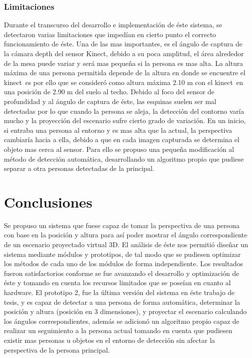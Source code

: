 \documentclass[a4paper,openright,12pt]{report}
\begin{document}
\subsection{Limitaciones}
Durante el transcurso del desarrollo e implementación de éste sistema, se detectaron varias limitaciones que impedían en cierto punto el correcto funcionamiento de éste. Una de las mas importantes, es el ángulo de captura de la cámara depth del sensor Kinect\textcopyright, debido a su poca amplitud, el área alrededor de la mesa puede variar y será mas pequeña si la persona es mas alta. La altura máxima de una persona permitida depende de la altura en donde se encuentre el kinect\textcopyright\, es por ello que se consideró como altura máxima 2.10 m con el kinect\textcopyright\ en una posición de 2.90 m del suelo al techo. Debido al foco del sensor de profundidad y al ángulo de captura de éste, las esquinas suelen ser mal detectadas por lo que cuando la persona se aleja, la detección del contorno varía mucho y la proyección del escenario sufre cierto grado de variación. En un inicio, si entraba una persona al entorno y es mas alta que la actual, la perspectiva cambiaría hacia a ella, debido a que en cada imagen capturada se determina el objeto mas cerca al sensor. Para ello se propuso una pequeña modificación al método de detección automática, desarrollando un algoritmo propio que pudiese separar a otra personas detectadas de la principal.

\chapter{Conclusiones}\label{cap.conclusiones}
Se propuso un sistema que fuese capaz de tomar la perspectiva de una persona con base en la posición y altura para así poder mostrar el ángulo correspondiente de un escenario proyectado virtual 3D. El análisis de éste nos permitió diseñar un sistema mediante módulos y prototipos, de tal modo que se pudiesen optimizar los métodos de cada uno de los módulos de forma independiente. Los resultados fueron satisfactorios conforme se fue avanzando el desarrollo y optimización de éste y tomando en cuenta los recursos limitados que se poseían en cuanto al hardware. El prototipo 2, fue la última versión del sistema en éste trabajo de tesis, y es capaz de detectar a una persona de forma automática, determinar la posición y altura (posición en 3 dimensiones), y proyectar el escenario calculando los ángulos correspondientes, además se adicionó un algoritmo propio capaz de realizar un seguimiento a la persona actual tomando en cuenta que pudiesen existir mas personas u objetos en el entorno de detección sin afectar la perspectiva de la persona principal.
\end{document}
